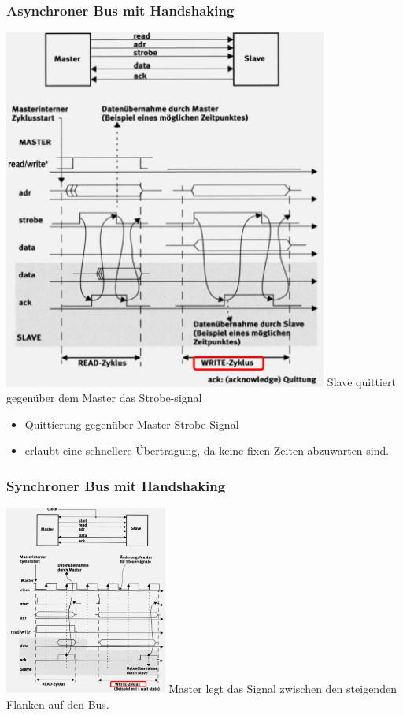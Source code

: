 \begin{multicols}{2}
\begin{minipage}{\linewidth}
        \subsubsection{Asynchroner Bus mit Handshaking}
        \includegraphics[width=0.8\textwidth]{images/SystembusSpeicherSpeichersystem/AsyBusmHand}\newline
        Slave quittiert gegenüber dem Master das Strobe-signal
        \begin{itemize}
            \item Quittierung gegenüber Master Strobe-Signal
            \item erlaubt eine schnellere Übertragung, da keine fixen Zeiten abzuwarten sind.
        \end{itemize}
    \end{minipage}
\end{multicols}

\begin{minipage}{\linewidth}
    \subsubsection{Synchroner Bus mit Handshaking}
    \includegraphics[width=0.4\textwidth]{images/SystembusSpeicherSpeichersystem/SynBusmHand}\newline
    Master legt das Signal zwischen den steigenden Flanken auf den Bus.
\end{minipage}

